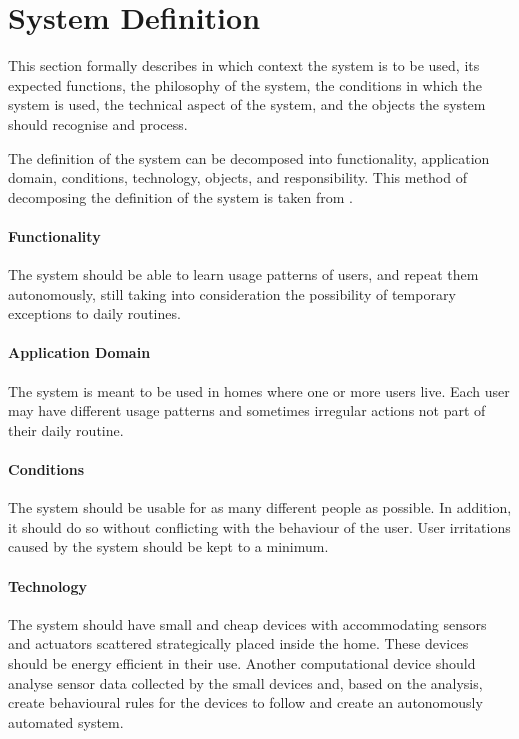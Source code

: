 \section{System Definition}\label{sec:systemDefinition}

This section formally describes in which context the system is to be used, its expected functions, the philosophy of the system, the conditions in which the system is used, the technical aspect of the system, and the objects the system should recognise and process.

The definition of the system can be decomposed into functionality, application domain, conditions, technology, objects, and responsibility. This method of decomposing the definition of the system is taken from \cite{mathiassen2001objektorienteret}.

\paragraph{Functionality}
The system should be able to learn usage patterns of users, and repeat them autonomously, still taking into consideration the possibility of temporary exceptions to daily routines.

\paragraph{Application Domain}
The system is meant to be used in homes where one or more users live. Each user may have different usage patterns and sometimes irregular actions not part of their daily routine. 

\paragraph{Conditions}
The system should be usable for as many different people as possible. In addition, it should do so without conflicting with the behaviour of the user. User irritations caused by the system should be kept to a minimum.

\paragraph{Technology}
The system should have small and cheap devices with accommodating sensors and actuators scattered strategically placed inside the home. These devices should be energy efficient in their use. Another computational device should analyse sensor data collected by the small devices and, based on the analysis, create behavioural rules for the devices to follow and create an autonomously automated system.

